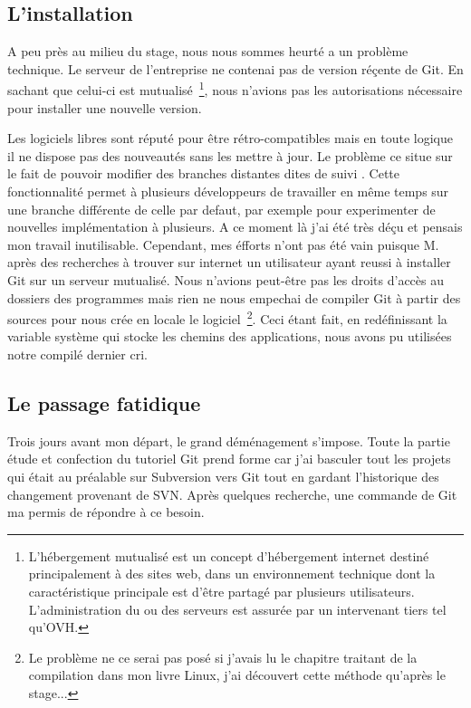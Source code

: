\subsection{L'installation} %

A peu près au milieu du stage, nous nous sommes heurté a un problème technique.
Le serveur de l'entreprise ne contenai pas de version réçente de Git. En
sachant que celui-ci est mutualisé\, \footnote{L'hébergement mutualisé est un
concept d'hébergement internet destiné principalement à des sites web, dans un
environnement technique dont la caractéristique principale est d'être partagé
par plusieurs utilisateurs. L'administration du ou des serveurs est assurée par
un intervenant tiers tel qu'OVH.}, nous n'avions pas les autorisations
nécessaire pour installer une nouvelle version.

Les logiciels libres sont réputé pour être rétro-compatibles mais en toute
logique il ne dispose pas des nouveautés sans les mettre à jour. Le problème ce
situe sur le fait de pouvoir modifier des branches distantes dites \og{} de
suivi \fg{}.  Cette fonctionnalité permet à plusieurs développeurs de
travailler en même temps sur une branche différente de celle par defaut, par
exemple pour experimenter de nouvelles implémentation à plusieurs. A ce moment
là j'ai été très déçu et pensais mon travail inutilisable. Cependant, mes
éfforts n'ont pas été vain puisque M. après des recherches à trouver sur
internet un utilisateur ayant reussi à installer Git sur un serveur mutualisé.
Nous n'avions peut-être pas les droits d'accès au dossiers des programmes mais
rien ne nous empechai de compiler Git à partir des sources pour nous crée en
locale le logiciel\, \footnote{Le problème ne ce serai pas posé si j'avais lu
le chapitre traitant de la compilation dans mon livre Linux, j'ai découvert
cette méthode qu'après le stage...}. Ceci étant fait, en redéfinissant la
variable système qui stocke les chemins des applications, nous avons pu
utilisées notre compilé dernier cri.

\subsection{Le passage fatidique} %

Trois jours avant mon départ, le grand déménagement s'impose. Toute la partie
étude et confection du tutoriel Git prend forme car j'ai basculer tout les
projets qui était au préalable sur Subversion vers Git tout en gardant
l'historique des changement provenant de SVN. Après quelques recherche, une
commande de Git ma permis de répondre à ce besoin.

